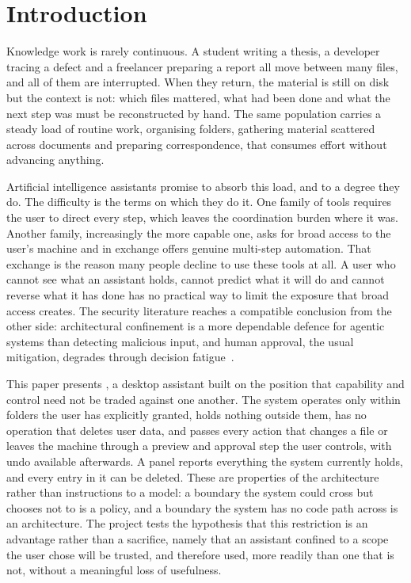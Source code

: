 \section{Introduction}
\label{sec:introduction}

Knowledge work is rarely continuous. A student writing a thesis, a developer tracing a defect and a freelancer preparing a report all move between many files, and all of them are interrupted. When they return, the material is still on disk but the context is not: which files mattered, what had been done and what the next step was must be reconstructed by hand. The same population carries a steady load of routine work, organising folders, gathering material scattered across documents and preparing correspondence, that consumes effort without advancing anything.

Artificial intelligence assistants promise to absorb this load, and to a degree they do. The difficulty is the terms on which they do it. One family of tools requires the user to direct every step, which leaves the coordination burden where it was. Another family, increasingly the more capable one, asks for broad access to the user's machine and in exchange offers genuine multi-step automation. That exchange is the reason many people decline to use these tools at all. A user who cannot see what an assistant holds, cannot predict what it will do and cannot reverse what it has done has no practical way to limit the exposure that broad access creates. The security literature reaches a compatible conclusion from the other side: architectural confinement is a more dependable defence for agentic systems than detecting malicious input, and human approval, the usual mitigation, degrades through decision fatigue~\cite{kim2026attackdefense}.

This paper presents \sys{}, a desktop assistant built on the position that capability and control need not be traded against one another. The system operates only within folders the user has explicitly granted, holds nothing outside them, has no operation that deletes user data, and passes every action that changes a file or leaves the machine through a preview and approval step the user controls, with undo available afterwards. A panel reports everything the system currently holds, and every entry in it can be deleted. These are properties of the architecture rather than instructions to a model: a boundary the system could cross but chooses not to is a policy, and a boundary the system has no code path across is an architecture. The project tests the hypothesis that this restriction is an advantage rather than a sacrifice, namely that an assistant confined to a scope the user chose will be trusted, and therefore used, more readily than one that is not, without a meaningful loss of usefulness.

